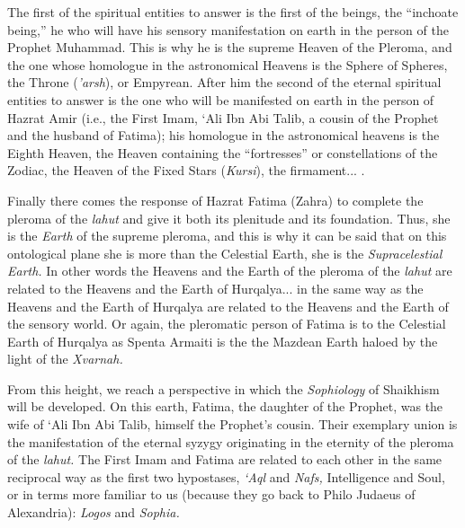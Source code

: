 \begin{quotationx}
The first of the spiritual entities to answer is the first of the beings, the ``inchoate being,'' he who will have his sensory manifestation on earth in the person of the Prophet Muhammad. This is why he is the supreme Heaven of the Pleroma, and the one whose homologue in the astronomical Heavens is the Sphere of Spheres, the Throne (\emph{'arsh}), or Empyrean. After him the second of the eternal spiritual entities to answer is the one who will be manifested on earth in the person of Hazrat Amir (i.e., the First Imam, `Ali Ibn Abi Talib, a cousin of the Prophet and the husband of Fatima); his homologue in the astronomical heavens is the Eighth Heaven, the Heaven containing the ``fortresses'' or constellations of the Zodiac, the Heaven of the Fixed Stars (\emph{Kursi}), the firmament... .

Finally there comes the response of Hazrat Fatima (Zahra) to complete the pleroma of the \emph{lahut} and give it both its plenitude and its foundation. Thus, she is the \emph{Earth} of the supreme pleroma, and this is why it can be said that on this ontological plane she is more than the Celestial Earth, she is the \emph{Supracelestial Earth.} In other words the Heavens and the Earth of the pleroma of the \emph{lahut} are related to the Heavens and the Earth of Hurqalya... in the same way as the Heavens and the Earth of Hurqalya are related to the Heavens and the Earth of the sensory world. Or again, the pleromatic person of Fatima is to the Celestial Earth of Hurqalya as Spenta Armaiti is the the Mazdean Earth haloed by the light of the \emph{Xvarnah.}

From this height, we reach a perspective in which the \emph{Sophiology} of Shaikhism will be developed. On this earth, Fatima, the daughter of the Prophet, was the wife of `Ali Ibn Abi Talib, himself the Prophet's cousin. Their exemplary union is the manifestation of the eternal syzygy originating in the eternity of the pleroma of the \emph{lahut.} The First Imam and Fatima are related to each other in the same reciprocal way as the first two hypostases, \emph{`Aql} and \emph{Nafs,} Intelligence and Soul, or in terms more familiar to us (because they go back to Philo Judaeus of Alexandria): \emph{Logos} and \emph{Sophia.}


\end{quotationx}
